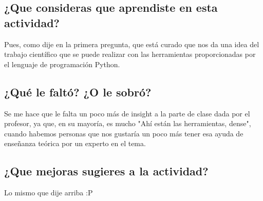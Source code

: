 \documentclass{article}
\begin{document}
\subsection{¿Que consideras que aprendiste en esta actividad?}
Pues, como dije en la primera pregunta, que está curado que nos da una idea del trabajo científico que se puede realizar con las herramientas proporcionadas por el lenguaje de programación Python.
\subsection{¿Qué le faltó? ¿O le sobró? }
Se me hace que le falta un poco más de insight a la parte de clase dada por el profesor, ya que, en su mayoría, es mucho "Ahí están las herramientas, dense", cuando habemos personas que nos gustaría un poco más tener esa ayuda de enseñanza teórica por un experto en el tema.
\subsection{¿Que mejoras sugieres a la actividad?}
Lo mismo que dije arriba :P
\end{document}
